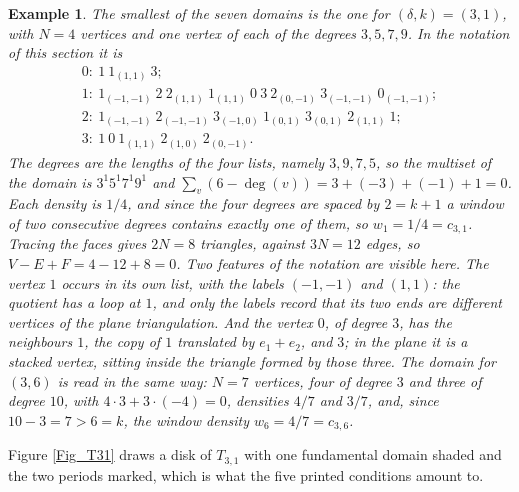\documentclass[12pt,a4paper]{article}%
\newtheorem{example}[theorem]{Example}
\begin{document}
\begin{example}
\label{Ex_T31}The smallest of the seven domains is the one for $(\delta ,k)=(3,1)$, with $N=4$
vertices and one vertex of each of the degrees $3,5,7,9$. In the notation of this section it is
\[
\begin{array}{l}
0:\ 1\ 1_{(1,1)}\ 3;\\
1:\ 1_{(-1,-1)}\ 2\ 2_{(1,1)}\ 1_{(1,1)}\ 0\ 3\ 2_{(0,-1)}\ 3_{(-1,-1)}\ 0_{(-1,-1)};\\
2:\ 1_{(-1,-1)}\ 2_{(-1,-1)}\ 3_{(-1,0)}\ 1_{(0,1)}\ 3_{(0,1)}\ 2_{(1,1)}\ 1;\\
3:\ 1\ 0\ 1_{(1,1)}\ 2_{(1,0)}\ 2_{(0,-1)}.
\end{array}
\]
The degrees are the lengths of the four lists, namely $3,9,7,5$, so the multiset of the domain is
$3^{1}5^{1}7^{1}9^{1}$ and $\sum_{v}(6-\deg (v))=3+(-3)+(-1)+1=0$. Each density is $1/4$, and since
the four degrees are spaced by $2=k+1$ a window of two consecutive degrees contains exactly one of
them, so $w_{1}=1/4=c_{3,1}$. Tracing the faces gives $2N=8$ triangles, against $3N=12$ edges, so
$V-E+F=4-12+8=0$. Two features of the notation are visible here. The vertex $1$ occurs in its own
list, with the labels $(-1,-1)$ and $(1,1)$: the quotient has a loop at $1$, and only the labels
record that its two ends are different vertices of the plane triangulation. And the vertex $0$, of
degree $3$, has the neighbours $1$, the copy of $1$ translated by $e_{1}+e_{2}$, and $3$; in the
plane it is a stacked vertex, sitting inside the triangle formed by those three. The domain for
$(3,6)$ is read in the same way: $N=7$ vertices, four of degree $3$ and three of degree $10$, with
$4\cdot 3+3\cdot (-4)=0$, densities $4/7$ and $3/7$, and, since $10-3=7>6=k$, the window density
$w_{6}=4/7=c_{3,6}$.
\end{example}

Figure \ref{Fig_T31} draws a disk of $T_{3,1}$ with one fundamental domain shaded and the
two periods marked, which is what the five printed conditions amount to.
\end{document}
